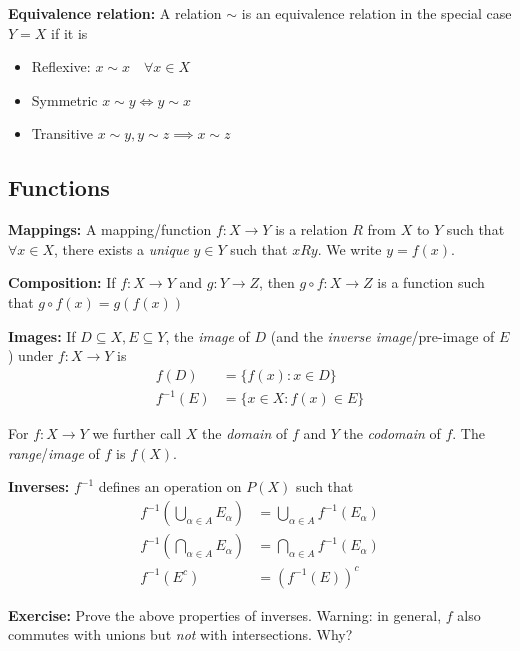 \documentclass[12pt]{report}
\newcommand{\sub}{\subseteq}
\newenvironment*{exercise}[1][red]{
    \begin{tcolorbox}[
        parbox=false,
        colback=#1!5!white,
        colframe=#1!75!black,
        breakable
    ]}
    {\end{tcolorbox}}
\begin{document}
    \textbf{Equivalence relation:} A relation $\sim$ is an equivalence relation in the special case $Y = X$ if it is
    \begin{itemize}
        \item Reflexive: $x\sim x \quad \forall x \in X$
        \item Symmetric $x\sim y \iff y\sim x$
        \item Transitive $x\sim y, y\sim z \implies x\sim z$
    \end{itemize}

    \subsection*{Functions}
    \textbf{Mappings:} A mapping/function $f: X \to Y$ is a relation $R$ from $X$ to $Y$ such that $\forall x \in X$, there exists a \emph{unique} $y \in Y$ such that $xRy$. We write $y = f(x)$.

    \textbf{Composition:} If $f: X \to Y$ and $g: Y \to Z$, then $g \circ f: X \to Z$ is a function such that $g \circ f(x) = g(f(x))$

    \textbf{Images:} If $D \sub X, E \sub Y$, the \emph{image} of $D$ (and the \emph{inverse image}/pre-image of $E$) under $f: X \to Y$ is
    \begin{align*}
        f(D) &= \{f(x) : x \in D\}\\ 
        f^{-1}(E) &= \{x \in X : f(x) \in E\}
    \end{align*}

    For $f: X \to Y$ we further call $X$ the \emph{domain} of $f$ and $Y$ the \emph{codomain} of $f$. The \emph{range}/\emph{image} of $f$ is $f(X)$.

    \textbf{Inverses:} $f^{-1}$ defines an operation on $P(X)$ such that
    \begin{align*}
        f^{-1}\left(\bigcup_{\alpha \in A} E_{\alpha}\right) &= \bigcup_{\alpha \in A} f^{-1}(E_{\alpha})\\
        f^{-1}\left(\bigcap_{\alpha \in A} E_{\alpha}\right) &= \bigcap_{\alpha \in A} f^{-1}(E_{\alpha})\\ 
        f^{-1}(E^c) &= (f^{-1}(E))^c
    \end{align*}
    
    \begin{exercise}
        \textbf{Exercise:} Prove the above properties of inverses. Warning: in general, $f$ also commutes with unions but \emph{not} with intersections. Why?
    \end{exercise}
\end{document}
